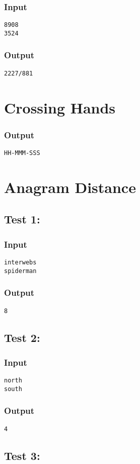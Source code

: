 \documentclass[twocolumn]{extarticle}
\begin{document}
\subsubsection*{Input}
\texttt{8908\\3524}

\subsubsection*{Output}
\texttt{2227/881}


\section{Crossing Hands}
\subsubsection*{Output}
\texttt{HH-MMM-SSS}


\section{Anagram Distance}
\subsection*{Test 1:}
\subsubsection*{Input}
\texttt{interwebs\\
spiderman}

\subsubsection*{Output}
\texttt{8}

\subsection*{Test 2:}
\subsubsection*{Input}
\texttt{north\\
south}

\subsubsection*{Output}
\texttt{4}

\subsection*{Test 3:}
\end{document}
